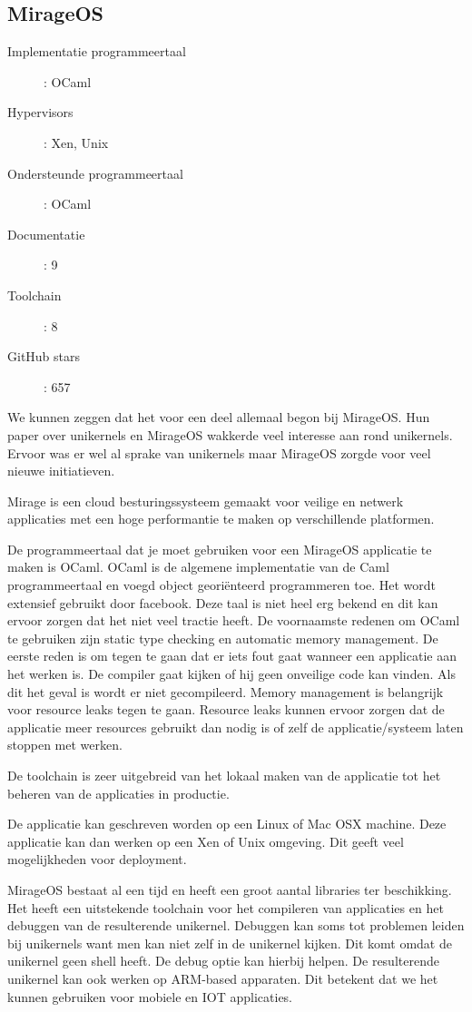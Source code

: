 \documentclass[pdftex,a4paper,12pt,twoside]{report}
\begin{document}
\subsection{MirageOS}

\begin{description}
  \item [Implementatie programmeertaal]: OCaml
  \item [Hypervisors]: Xen, Unix
  \item [Ondersteunde programmeertaal]: OCaml
  \item [Documentatie]: 9
  \item [Toolchain]: 8
  \item [GitHub stars]: 657
\end{description}

We kunnen zeggen dat het voor een deel allemaal begon bij MirageOS. Hun paper over unikernels en MirageOS wakkerde veel interesse aan rond unikernels. Ervoor was er wel al sprake van unikernels maar MirageOS zorgde voor veel nieuwe initiatieven.

Mirage is een cloud besturingssysteem gemaakt voor veilige en netwerk applicaties met een hoge performantie te maken op verschillende platformen.

De programmeertaal dat je moet gebruiken voor een MirageOS applicatie te maken is OCaml. 
OCaml is de algemene implementatie van de Caml programmeertaal en voegd object georiënteerd programmeren toe. Het wordt extensief gebruikt door facebook. Deze taal is niet heel erg bekend en dit kan ervoor zorgen dat het niet veel tractie heeft.
De voornaamste redenen om OCaml te gebruiken zijn static type checking en automatic memory management. De eerste reden is om tegen te gaan dat er iets fout gaat wanneer een applicatie aan het werken is. De compiler gaat kijken of hij geen onveilige code kan vinden. Als dit het geval is wordt er niet gecompileerd.
Memory management is belangrijk voor resource leaks tegen te gaan. Resource leaks kunnen ervoor zorgen dat de applicatie meer resources gebruikt dan nodig is of zelf de applicatie/systeem laten stoppen met werken.

De toolchain is zeer uitgebreid van het lokaal maken van de applicatie tot het beheren van de applicaties in productie.

De applicatie kan geschreven worden op een Linux of Mac OSX machine. Deze applicatie kan dan werken op een Xen of Unix omgeving. Dit geeft veel mogelijkheden voor deployment.

MirageOS bestaat al een tijd en heeft een groot aantal libraries ter beschikking. Het heeft een uitstekende toolchain voor het compileren van applicaties en het debuggen van de resulterende unikernel. Debuggen kan soms tot problemen leiden bij unikernels want men kan niet zelf in de unikernel kijken. Dit komt omdat de unikernel geen shell heeft. De debug optie kan hierbij helpen. De resulterende unikernel kan ook werken op ARM-based apparaten. Dit betekent dat we het kunnen gebruiken voor mobiele en IOT applicaties.
\end{document}
